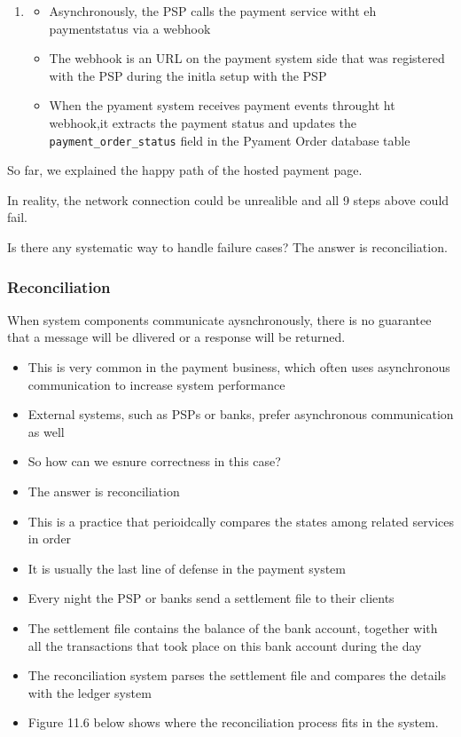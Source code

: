 \documentclass{report}
\theoremstyle{definition}
\let\oldsubsubsection\subsubsection
\renewcommand{\subsubsection}{\oldsubsubsection*}
\begin{document}
\begin{enumerate}
\item

\begin{itemize}
\item
Asynchronously, the PSP calls the payment service witht eh paymentstatus via a webhook
\item
The webhook is an URL on the payment system side that was registered with the PSP during the initla setup with the PSP
\item
When the pyament system receives payment events throught ht webhook,it extracts the payment status and updates the \lstinline|payment_order_status| field in the Pyament Order database table
\end{itemize}
\end{enumerate}

So far, we explained the happy path of the hosted payment page.

In reality, the network connection could be unrealible and all 9 steps above could fail.

Is there any systematic way to handle failure cases? The answer is reconciliation.

\subsubsection{Reconciliation}

When system components communicate aysnchronously, there is no guarantee that a message will be dlivered or a response will be returned.

\begin{itemize}
\item
This is very common in the payment business, which often uses asynchronous communication to increase system performance
\item
External systems, such as PSPs or banks, prefer asynchronous communication as well
\item
So how can we esnure correctness in this case?
\item
The answer is reconciliation
\item
This is a practice that perioidcally compares the states among related services in order
\item
It is usually the last line of defense in the payment system
\item
Every night the PSP or banks send a settlement file to their clients
\item
The settlement file contains the balance of the bank account, together with all the transactions that took place on this bank account during the day
\item
The reconciliation system parses the settlement file and compares the details with the ledger system
\item
Figure 11.6 below shows where the reconciliation process fits in the system.
\end{itemize}
\end{document}

